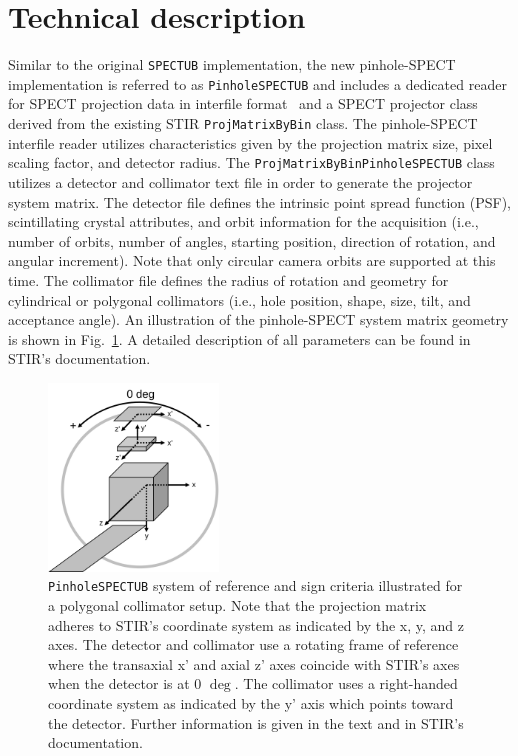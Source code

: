 \documentclass[utf8]{FrontiersinHarvard} %
\begin{document}
\section{Technical description}

Similar to the original \texttt{SPECTUB} implementation, the new pinhole-SPECT implementation is referred to as \texttt{PinholeSPECTUB} and includes a dedicated reader for SPECT projection data in interfile format~\cite{interfile} and a SPECT projector class derived from the existing STIR \texttt{ProjMatrixByBin} class. The pinhole-SPECT interfile reader utilizes characteristics given by the projection matrix size, pixel scaling factor, and detector radius. The \texttt{ProjMatrixByBinPinholeSPECTUB} class utilizes a detector and collimator text file in order to generate the projector system matrix. The detector file defines the intrinsic point spread function (PSF), scintillating crystal attributes, and orbit information for the acquisition (i.e., number of orbits, number of angles, starting position, direction of rotation, and angular increment). Note that only circular camera orbits are supported at this time. The collimator file defines the radius of rotation and geometry for cylindrical or polygonal collimators (i.e., hole position, shape, size, tilt, and acceptance angle). An illustration of the pinhole-SPECT system matrix geometry is shown in Fig.~\ref{fig:PinholeSPECTUB_coords}. A detailed description of all parameters can be found in STIR's documentation.

\begin{figure}[htbp]
\begin{center}
\includegraphics[height=5cm]{STIR-UsersGuide_PinholeSPECTUB}
\caption{\texttt{PinholeSPECTUB} system of reference and sign criteria illustrated for a polygonal collimator setup. Note that the projection matrix adheres to STIR's coordinate system as indicated by the x, y, and z axes. The detector and collimator use a rotating frame of reference where the transaxial x' and axial z' axes coincide with STIR's axes when the detector is at 0 $\mathrm{\deg}$. The collimator uses a right-handed coordinate system as indicated by the y' axis which points toward the detector. Further information is given in the text and in STIR's documentation.}
\label{fig:PinholeSPECTUB_coords}
\end{center}
\end{figure}
\end{document}

